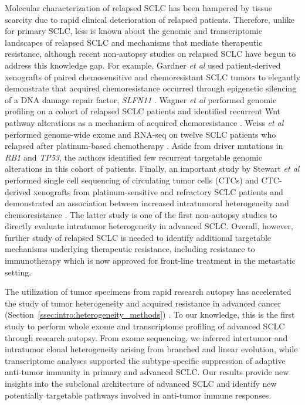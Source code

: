 Molecular characterization of relapsed SCLC has been hampered by tissue scarcity due to rapid clinical deterioration of relapsed patients. Therefore, unlike for primary SCLC, less is known about the genomic and transcriptomic landscapes of relapsed SCLC and mechanisms that mediate therapeutic resistance, although recent non-autopsy studies on relapsed SCLC have begun to address this knowledge gap. For example, Gardner \textit{et al} used patient-derived xenografts of paired chemosensitive and chemoresistant SCLC tumors to elegantly demonstrate that acquired chemoresistance occurred through epigenetic silencing of a DNA damage repair factor, \textit{SLFN11} \cite{gardner2017}. Wagner \textit{et al} performed genomic profiling on a cohort of relapsed SCLC patients and identified recurrent Wnt pathway alterations as a mechanism of acquired chemoresistance \cite{wagner2018}. Weiss \textit{et al} performed genome-wide exome and RNA-seq on twelve SCLC patients who relapsed after platinum-based chemotherapy \cite{weiss2017}. Aside from driver mutations in \textit{RB1} and \textit{TP53}, the authors identified few recurrent targetable genomic alterations in this cohort of patients. Finally, an important study by Stewart \textit{et al} performed single cell sequencing of circulating tumor cells (CTCs) and CTC-derived xenografts from platinum-sensitive and refractory SCLC patients and demonstrated an association between increased intratumoral heterogeneity and chemoresistance \cite{stewart2020}. The latter study is one of the first non-autopsy studies to directly evaluate intratumor heterogeneity in advanced SCLC\@. Overall, however, further study of relapsed SCLC is needed to identify additional targetable mechanisms underlying therapeutic resistance, including resistance to immunotherapy which is now approved for front-line treatment in the metastatic setting. 

The utilization of tumor specimens from rapid research autopsy has accelerated the study of tumor heterogeneity and acquired resistance in advanced cancer (Section~\ref{ssec:intro:heterogeneity_methods}) \cite{krook2019_review}. To our knowledge, this is the first study to perform whole exome and transcriptome profiling of advanced SCLC through research autopsy. From exome sequencing, we inferred intertumor and intratumor clonal heterogeneity arising from branched and linear evolution, while transcriptome analyses supported the subtype-specific suppression of adaptive anti-tumor immunity in primary and advanced SCLC\@. Our results provide new insights into the subclonal architecture of advanced SCLC and identify new potentially targetable pathways involved in anti-tumor immune responses.

